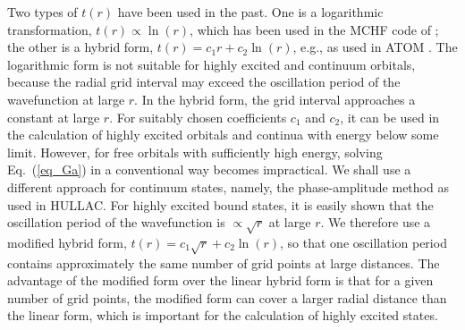 \documentclass[preprint, floatfix, pra, showpacs, showkeys]{revtex4}
\begin{document}
Two types of $t(r)$ have been used in the past. One is a logarithmic
transformation, $t(r) \propto \ln(r)$, which has been used in the MCHF code of
\textcite{fischer00}; the other is a hybrid form, $t(r) = c_1 r + c_2 \ln(r)$,
e.g., as used in ATOM \cite{amusia97}. The logarithmic form is not
suitable for 
highly excited and continuum orbitals, because the radial grid interval may
exceed the oscillation period of the wavefunction at large $r$. In the hybrid
form, the grid interval approaches a constant at large $r$. For suitably
chosen coefficients $c_1$ and $c_2$, it can be used in the calculation of
highly excited orbitals and continua with energy below some limit. However,
for free orbitals with sufficiently high energy, solving Eq.~(\ref{eq_Ga})
in a conventional way becomes impractical. We shall use a different approach
for continuum states, namely, the phase-amplitude method as used in
HULLAC. For highly excited bound states, it is easily shown that the
oscillation period of the 
wavefunction is $\propto \sqrt{r}$ at large $r$. We therefore use a modified
hybrid form, $t(r) = c_1\sqrt{r} + c_2\ln(r)$, so that 
one oscillation period contains approximately the same number of grid points
at large distances. The advantage of the modified form
over the linear hybrid form is that for a given number of grid points, the
modified form can cover a larger radial distance than the linear form, which is
important for the calculation of highly excited states. 
\end{document}
